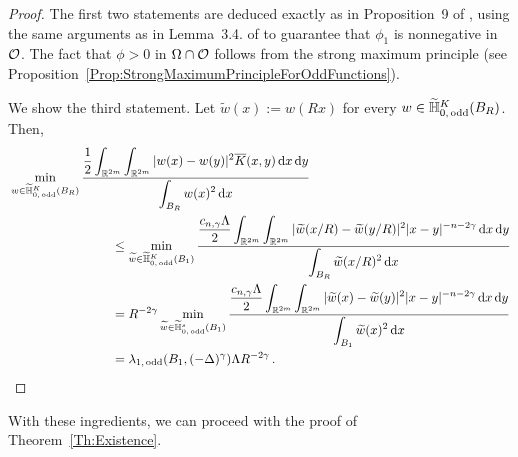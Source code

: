 \begin{proof}
	The first two statements are deduced exactly as in Proposition~9 of \cite{ServadeiValdinoci}, using the same arguments as in  Lemma~3.4. of \cite{FelipeSanz-Perela:IntegroDifferentialI} to guarantee that $\phi_1$ is nonnegative in $\mathcal{O}$. The fact that $\phi > 0$ in $\Omega \cap \mathcal{O}$ follows from the strong maximum principle (see Proposition~\ref{Prop:StrongMaximumPrincipleForOddFunctions}).
	
	We show the third statement. Let $\widetilde{w} (x):= w(Rx)$ for every $w\in \widetilde{\mathbb{H}}^K_{0, \, \mathrm{odd}}(B_R)$. Then,
	\begin{align*}
	& \min_{w \in \widetilde{\mathbb{H}}^K_{0, \, \mathrm{odd}}(B_R)} \dfrac{\dfrac{1}{2}  \displaystyle\int_{\mathbb{R}^{2m}} \int_{\mathbb{R}^{2m}} |w(x) - w(y)|^2 \overline{K}(x,y) \,\mathrm{d} x \,\mathrm{d} y}{ \displaystyle \int_{B_R} w(x)^2 \,\mathrm{d} x} \quad \quad \quad \quad \quad \quad \quad \quad \quad \quad \quad \quad\\
	&  \quad \quad \quad \quad \quad \quad \quad \quad \leq \min_{\widetilde{w} \in \widetilde{\mathbb{H}}^K_{0, \, \mathrm{odd}}(B_1)} \dfrac{\dfrac{c_{n, \gamma}\Lambda}{2}  \displaystyle\int_{\mathbb{R}^{2m}} \int_{\mathbb{R}^{2m}} |\widetilde{w}(x/R) - \widetilde{w}(y/R)|^2 |x - y|^{-n-2 \gamma}\,\mathrm{d} x \,\mathrm{d} y}{ \displaystyle \int_{B_R} \widetilde{w}(x/R)^2 \,\mathrm{d} x}
	\\
	& \quad \quad \quad \quad \quad \quad \quad \quad = R^{-2 \gamma }\min_{\widetilde{w} \in \widetilde{\mathbb{H}}^s_{0, \, \mathrm{odd}}(B_1)} \dfrac{\dfrac{c_{n, \gamma}\Lambda}{2}  \displaystyle\int_{\mathbb{R}^{2m}} \int_{\mathbb{R}^{2m}} |\widetilde{w}(x) - \widetilde{w}(y)|^2 |x - y|^{-n-2 \gamma}\,\mathrm{d} x \,\mathrm{d} y}{ \displaystyle \int_{B_1} \widetilde{w}(x)^2 \,\mathrm{d} x}
	\\
	& \quad \quad \quad \quad \quad \quad \quad \quad = \lambda_{1, \, \mathrm{odd}}(B_1, (-\Delta)^\gamma) \Lambda R^{-2 \gamma } \,.
	\end{align*}
\end{proof}


With these ingredients, we can proceed with the proof of Theorem~\ref{Th:Existence}.

